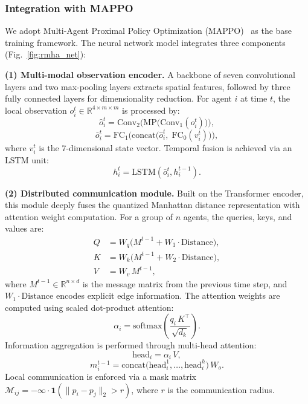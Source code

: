 \documentclass[sigconf]{acmart}
\begin{document}
\subsubsection{Integration with MAPPO}

We adopt Multi-Agent Proximal Policy Optimization
(MAPPO)~\cite{zhou2025mappo,zhang2025mappo,ding2025mappo}
as the base training framework.
The neural network model integrates three components
(Fig.~\ref{fig:rmha_net}):

\textbf{(1) Multi-modal observation encoder.}
A backbone of seven convolutional layers and two max-pooling
layers extracts spatial features, followed by three fully
connected layers for dimensionality reduction.
For agent $i$ at time $t$, the local observation
$o_i^t \in \mathbb{R}^{4\times m\times m}$ is processed by:
\begin{equation}\label{eq:conv}
  \hat{o}_i^t = \mathrm{Conv}_2\!\bigl(\mathrm{MP}\bigl(
    \mathrm{Conv}_1(o_i^t)\bigr)\bigr),
\end{equation}
\begin{equation}\label{eq:fc_concat}
  \bar{o}_i^t = \mathrm{FC}_1\!\bigl(\mathrm{concat}\bigl(
    \hat{o}_i^t,\; \mathrm{FC}_0(v_i^t)\bigr)\bigr),
\end{equation}
where $v_i^t$ is the 7-dimensional state vector.
Temporal fusion is achieved via an LSTM unit:
\begin{equation}\label{eq:lstm}
  h_i^t = \mathrm{LSTM}(\bar{o}_i^t, h_i^{t-1}).
\end{equation}

\textbf{(2) Distributed communication module.}
Built on the Transformer encoder, this module deeply fuses the
quantized Manhattan distance representation with attention weight
computation.
For a group of $n$ agents, the queries, keys, and values are:
\begin{align}
  Q &= W_q\bigl(M^{t-1} + W_1 \cdot \mathrm{Distance}\bigr),
      \label{eq:Q} \\
  K &= W_k\bigl(M^{t-1} + W_2 \cdot \mathrm{Distance}\bigr),
      \label{eq:K} \\
  V &= W_v\, M^{t-1}, \label{eq:V}
\end{align}
where $M^{t-1}\in\mathbb{R}^{n\times d}$ is the message matrix
from the previous time step, and
$W_1\cdot\mathrm{Distance}$ encodes explicit edge information.
The attention weights are computed using scaled dot-product
attention:
\begin{equation}\label{eq:attn_weight}
  \alpha_i = \mathrm{softmax}\!\left(
    \frac{q_i\, K^\top}{\sqrt{d_k}}\right).
\end{equation}
Information aggregation is performed through multi-head attention:
\begin{equation}\label{eq:head}
  \mathrm{head}_i = \alpha_i\, V,
\end{equation}
\begin{equation}\label{eq:msg}
  m_i^{t-1} = \mathrm{concat}\!\bigl(
    \mathrm{head}_i^1, \ldots, \mathrm{head}_i^h\bigr)\, W_o.
\end{equation}
Local communication is enforced via a mask matrix
$\mathcal{M}_{ij}=-\infty \cdot \mathbf{1}(\|p_i-p_j\|_2 > r)$,
where $r$ is the communication radius.
\end{document}
